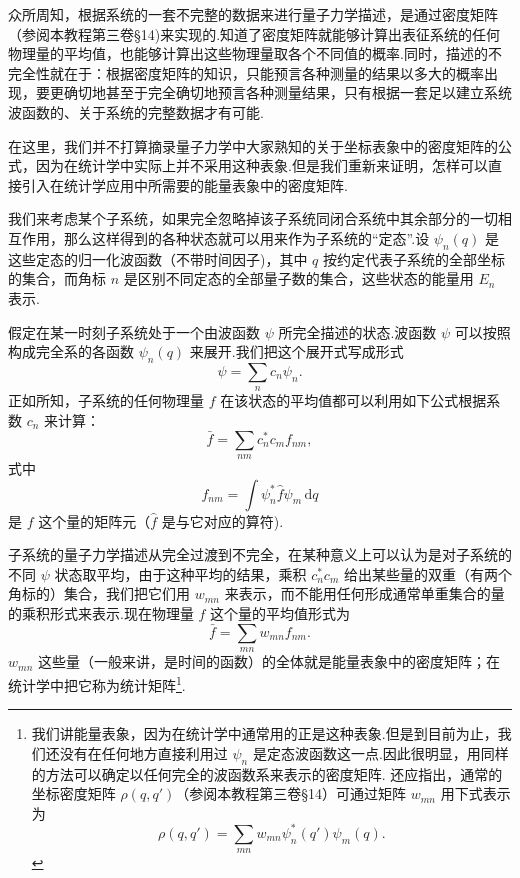 众所周知，根据系统的一套不完整的数据来进行量子力学描述，是通过密度矩阵（参阅本教程第三卷§14)来实现的.知道了密度矩阵就能够计算出表征系统的任何物理量的平均值，也能够计算出这些物理量取各个不同值的概率.同时，描述的不完全性就在于：根据密度矩阵的知识，只能预言各种测量的结果以多大的概率出现，要更确切地甚至于完全确切地预言各种测量结果，只有根据一套足以建立系统波函数的、关于系统的完整数据才有可能.

在这里，我们并不打算摘录量子力学中大家熟知的关于坐标表象中的密度矩阵的公式，因为在统计学中实际上并不采用这种表象.但是我们重新来证明，怎样可以直接引入在统计学应用中所需要的能量表象中的密度矩阵.

我们来考虑某个子系统，如果完全忽略掉该子系统同闭合系统中其余部分的一切相互作用，那么这样得到的各种状态就可以用来作为子系统的“定态”.设 $\psi_n(q)$ 是这些定态的归一化波函数（不带时间因子)，其中 $q$ 按约定代表子系统的全部坐标的集合，而角标 $n$ 是区别不同定态的全部量子数的集合，这些状态的能量用 $E_n$ 表示.

假定在某一时刻子系统处于一个由波函数 $\psi$ 所完全描述的状态.波函数 $\psi$ 可以按照构成完全系的各函数 $\psi_n(q)$ 来展开.我们把这个展开式写成形式
\begin{equation}
  \psi=\sum_n c_n\psi_n.
\end{equation}
正如所知，子系统的任何物理量 $f$ 在该状态的平均值都可以利用如下公式根据系数 $c_n$ 来计算：
\begin{equation}
  \bar{f}=\sum_{nm}c_n^{*}c_m f_{nm},
\end{equation}
式中
\begin{equation}
  f_{nm}=\int\psi_n^{*}\hat{f}\psi_m\,\mathrm{d}q
\end{equation}
是 $f$ 这个量的矩阵元（$\hat{f}$ 是与它对应的算符).

子系统的量子力学描述从完全过渡到不完全，在某种意义上可以认为是对子系统的不同 $\psi$ 状态取平均，由于这种平均的结果，乘积 $c_n^{*}c_m$ 给出某些量的双重（有两个角标的）集合，我们把它们用 $w_{mn}$ 来表示，而不能用任何形成通常单重集合的量的乘积形式来表示.现在物理量 $f$ 这个量的平均值形式为
\begin{equation}
  \bar{f}=\sum_{mn}w_{mn}f_{nm}.
\end{equation}
$w_{mn}$ 这些量（一般来讲，是时间的函数）的全体就是能量表象中的密度矩阵；在统计学中把它称为统计矩阵\footnote{我们讲能量表象，因为在统计学中通常用的正是这种表象.但是到目前为止，我们还没有在任何地方直接利用过 $\psi_n$ 是定态波函数这一点.因此很明显，用同样的方法可以确定以任何完全的波函数系来表示的密度矩阵.
还应指出，通常的坐标密度矩阵 $\rho(q,q')$（参阅本教程第三卷§14）可通过矩阵 $w_{mn}$ 用下式表示为
\begin{equation*}
  \rho(q,q')=\sum_{mn}w_{mn}\psi_n^{*}(q')\psi_m(q).
\end{equation*}}.

